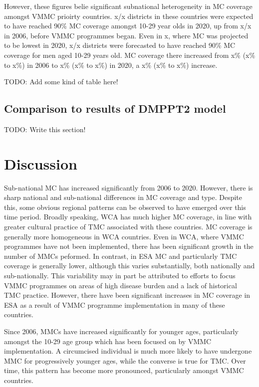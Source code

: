 \documentclass[a4paper, 12pt]{article}
\begin{document}
However, these figures belie significant subnational heterogeneity in MC coverage amongst VMMC prioirty countries. 
x/x districts in these countries were expected to have reached 90\% MC coverage amongst 10-29 year olds in 2020, up from x/x in 2006, before VMMC programmes began. 
Even in x, where MC was projected to be lowest in 2020, x/x districts were forecasted to have reached 90\% MC coverage for men aged 10-29 years old. 
MC coverage there increased from x\% (x\% to x\%) in 2006 to x\% (x\% to x\%) in 2020, a x\% (x\% to x\%) increase. 

TODO: Add some kind of table here!

\subsection{Comparison to results of DMPPT2 model}
\label{sec:orge0178ca}

TODO: Write this section!

\section{Discussion}
\label{sec:orgca35e01}

Sub-national MC has increased significantly from 2006 to 2020. 
However, there is sharp national and sub-national differences in MC coverage and type. 
Despite this, some obvious regional patterns can be observed to have emerged over this time period. 
Broadly speaking, WCA has much higher MC coverage, in line with greater cultural practice of TMC associated with these countries. 
MC coverage is generally more homogeneous in WCA countries. 
Even in WCA, where VMMC programmes have not been implemented, there has been significant growth in the number of MMCs peformed. 
In contrast, in ESA MC and particularly TMC coverage is generally lower, although this varies substantially, both nationally and sub-nationally. 
This variability may in part be attributed to efforts to focus VMMC programmes on areas of high disease burden and a lack of historical TMC practice. 
However, there have been significant increases in MC coverage in ESA as a result of VMMC programme implementation in many of these countries.

Since 2006, MMCs have increased significantly for younger ages, particularly amongst the 10-29 age group which has been focused on by VMMC implementation. 
A circumcised individual is much more likely to have undergone MMC for progressively younger ages, while the converse is true for TMC.
Over time, this pattern has become more pronounced, particularly amongst VMMC countries. 
\end{document}
